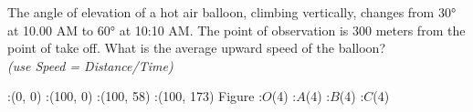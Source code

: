 
%
%
%
%
% 

\question[5]  The angle of elevation of a hot air balloon, climbing vertically, changes from $\ang{30}$ at 10.00 AM to $\ang{60}$ at 10:10 AM. The point of observation is 300 meters from the point of take off. What is the average upward speed of the balloon? \\
\textit{(use Speed = Distance/Time)}

\ifprintanswers
	\begin{marginfigure}
		:(0, 0)
		:(100, 0)
		:(100, 58)
		:(100, 173)
		\figdrawbegin{}
			\figdrawline[1,2,3,4,1]
			\figdrawline[3,1]
		\figdrawend
		\figvisu{\figBoxA} {Figure}
		{
			:$O$(4)
			:$A$(4)
			:$B$(4)
			:$C$(4)
		}
		\centerline{\box\figBoxA}
	\end{marginfigure}
\fi 


